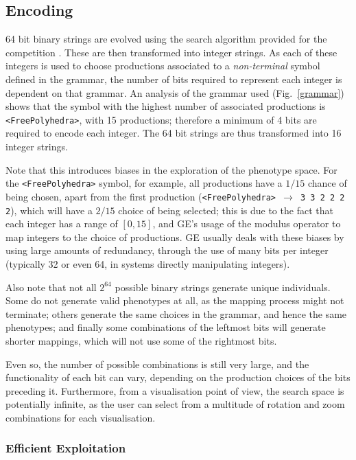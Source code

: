 \documentclass{article}
\begin{document}
\subsection{Encoding}

64 bit binary strings are evolved using the search algorithm provided for the competition \cite{browne2013a}.
These are then transformed into integer strings. As each of
these integers is used to choose productions associated to a
\textit{non-terminal} symbol defined in the grammar, the number of bits required to
represent each integer is dependent on that grammar. An analysis of the
grammar used (Fig.~\ref{grammar}) shows that the symbol with the highest number
of associated productions is \texttt{<FreePolyhedra>}, with 15 productions;
therefore a minimum of 4 bits are required to encode each integer. The 64 bit
strings are thus transformed into 16 integer strings.

Note that this introduces biases in the exploration of the phenotype space. For
the \texttt{<FreePolyhedra>} symbol, for example, all productions have a $1/15$
chance of being chosen, apart from the first production
(\texttt{<FreePolyhedra> $\rightarrow$ 3 3 2 2 2 2}), which will have a $2/15$
choice of being selected; this is due to the fact that each integer has a range of
$[0,15]$, and GE's usage of the modulus operator to map integers to the choice
of productions.  GE usually deals with these biases by using large amounts of
redundancy, through the use of many bits per integer (typically 32 or even 64,
in systems directly manipulating integers).

Also note that not all $2^{64}$ possible binary strings generate unique
individuals. Some do not generate valid phenotypes at all, as the mapping
process might not terminate; others generate the same choices in the grammar,
and hence the same phenotypes; and finally some combinations of the leftmost
bits will generate shorter mappings, which will not use some of the rightmost
bits.

Even so, the number of possible combinations is still very large, and the
functionality of each bit can vary, depending on the production choices of the
bits preceding it. Furthermore, from a visualisation point of view, the search
space is potentially infinite, as the user can select from a multitude of
rotation and zoom combinations for each visualisation.

\subsubsection{Efficient Exploitation}
\end{document}
